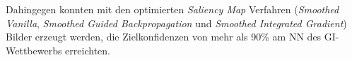 Dahingegen konnten mit den optimierten \textit{Saliency Map} Verfahren (\textit{Smoothed Vanilla}, \textit{Smoothed Guided Backpropagation} und \textit{Smoothed Integrated Gradient}) Bilder erzeugt werden, die Zielkonfidenzen von mehr als 90\% am \ac{NN} des \ac{GI}-Wettbewerbs erreichten.

%
%


